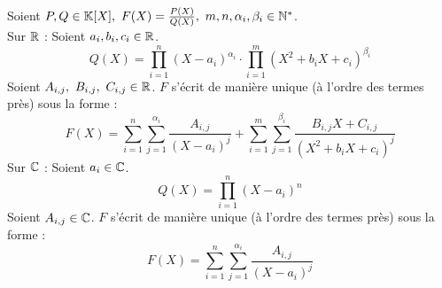 \begin{theorem}
	Soient $P, Q \in \mathbb{K}[X],\ F(X) = \frac{P(X)}{Q(X)},\ m, n, \alpha_i, \beta_i \in \mathbb{N}^*$.
	\\
	Sur $\mathbb{R}$ : Soient $a_i, b_i, c_i \in \mathbb{R}$.
	\[ Q(X) = \prod_{i = 1}^{n} (X - a_i)^{\alpha_i} \cdot \prod_{i = 1}^{m} (X^2 + b_i X + c_i)^{\beta_i} \]
	Soient $A_{i, j},\ B_{i, j},\ C_{i, j} \in \mathbb{R}$. $F$ s'écrit de manière unique (à l'ordre des termes près) sous la forme :
	\[ F(X) = \sum_{i = 1}^{n} \sum_{j = 1}^{\alpha_i} \frac{A_{i, j}}{\left(X - a_i\right)^{j}} + \sum_{i = 1}^{m} \sum_{j = 1}^{\beta_i} \frac{B_{i, j}X + C_{i, j}}{(X^2 + b_iX + c_i)^{j}} \]
	Sur $\mathbb{C}$ : Soient $a_i \in \mathbb{C}$.
	\[ Q(X) = \prod_{i = 1}^{n} (X - a_i)^{n} \]
	Soient $A_{i, j} \in \mathbb{C}$. $F$ s'écrit de manière unique (à l'ordre des termes près) sous la forme :
	\[ F(X) = \sum_{i = 1}^{n} \sum_{j = 1}^{\alpha_i} \frac{A_{i, j}}{\left(X - a_i\right)^{j}} \]
\end{theorem}

